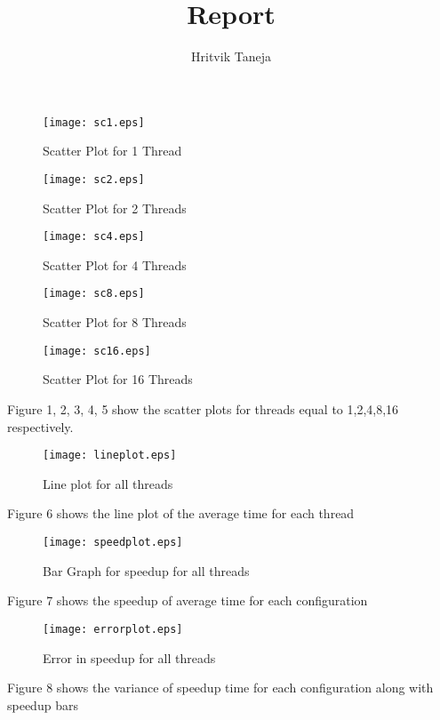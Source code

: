 \documentclass{article}
\title{Report}
\author{Hritvik Taneja}
\date{}
\begin{document}
\maketitle

\begin{figure}[H]
    \centering
    \texttt{[image: sc1.eps]}
    \caption{Scatter Plot for 1 Thread}
    \label{fig:sc1}
\end{figure}
\begin{figure}[H]
    \centering
    \texttt{[image: sc2.eps]}
    \caption{Scatter Plot for 2 Threads}
    \label{fig:sc2}
\end{figure}
\begin{figure}[H]
    \centering
    \texttt{[image: sc4.eps]}
    \caption{Scatter Plot for 4 Threads}
    \label{fig:sc4}
\end{figure}
\begin{figure}[H]
    \centering
    \texttt{[image: sc8.eps]}
    \caption{Scatter Plot for 8 Threads}
    \label{fig:sc8}
\end{figure}
\begin{figure}[H]
    \centering
    \texttt{[image: sc16.eps]}
    \caption{Scatter Plot for 16 Threads}
    \label{fig:sc16}
\end{figure}

Figure 1, 2, 3, 4, 5 show the scatter plots for threads equal to 1,2,4,8,16 respectively.
\begin{figure}[H]
    \centering
    \texttt{[image: lineplot.eps]}
    \caption{Line plot for all threads}
    \label{fig:lp}
\end{figure}
Figure 6 shows the line plot of the average time for each thread
\begin{figure}[H]
    \centering
    \texttt{[image: speedplot.eps]}
    \caption{Bar Graph for speedup for all threads}
    \label{fig:sp}
\end{figure}

Figure 7 shows the speedup of average time for each configuration
\begin{figure}[H]
    \centering
    \texttt{[image: errorplot.eps]}
    \caption{Error in speedup for all threads}
    \label{fig:ep}
\end{figure}

Figure 8 shows the variance of speedup time for each configuration along with speedup bars
\end{document}

